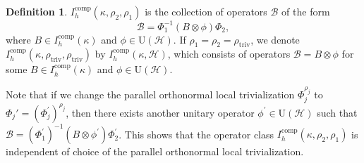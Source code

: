 \documentclass[11pt,oneside,reqno]{amsart}
\theoremstyle{definition}
\newtheorem{definition}{Definition}[section]
\numberwithin{equation}{section}
\theoremstyle{plain}
\begin{document}
\begin{definition}\label{defoffioonbundles}
$I_{h}^{\mathrm{comp}}(\kappa,\rho_{2},\rho_{1})$ is the collection of operators $\mathcal{B}$ of the form
\begin{equation*}
    \mathcal{B}=\Phi_{1}^{-1}(B \otimes \phi)\Phi_{2},
\end{equation*}
where $B\in I_{h}^{\mathrm{comp}}( \kappa )$ and $\phi \in \mathrm{U}(\mathcal{H})$. If $\rho_{1}=\rho_{2}=\rho_{\mathrm{triv}}$, we denote $I_{h}^{\mathrm{comp}}(\kappa,\rho_{\mathrm{triv}},\rho_{\mathrm{triv}})$ by $I_{h}^{\mathrm{comp}}(\kappa,\mathcal{H})$, which consists of operators $\mathcal{B} = B \otimes \phi $ for some $B \in I_{h}^{\mathrm{comp}}(\kappa)$ and $\phi \in \mathrm{U}(\mathcal{H})$.
\end{definition}

Note that if we change the parallel orthonormal local trivialization $\Phi_{j}^{\rho_j}$ to $\Phi_j'=(\Phi_{j}^{\prime})^{\rho_j}$, then there exists another unitary operator $\phi^{\prime}\in \mathrm{U}(\mathcal{H})$ such that
$\mathcal{B}=(\Phi_{1}^{\prime})^{-1}(B \otimes \phi^{\prime})\Phi_{2}^{\prime}$. This shows that the operator class $I_{h}^{\mathrm{comp}}(\kappa,\rho_{2},\rho_{1})$ is independent of choice of the parallel orthonormal local trivialization.
\end{document}
